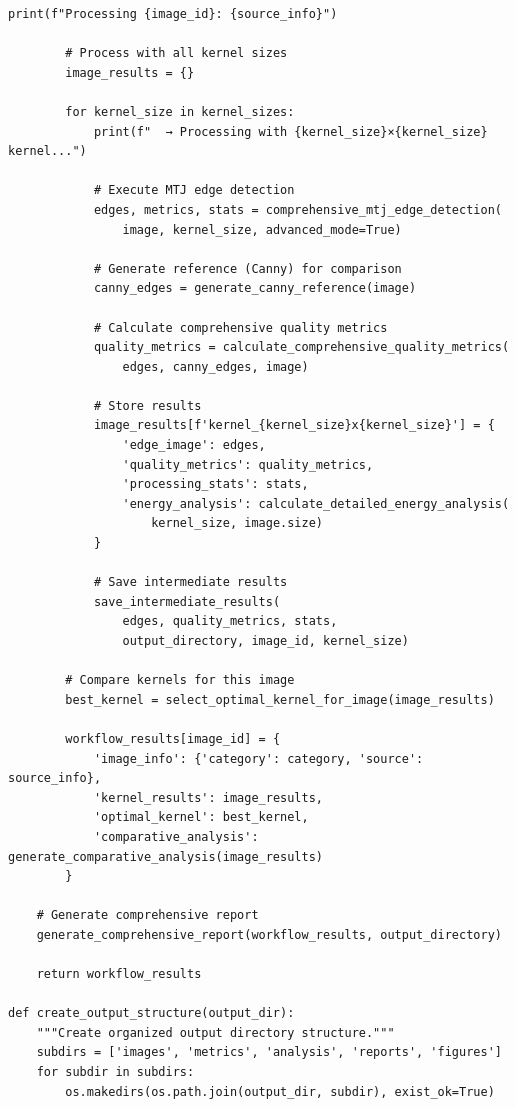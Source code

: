\documentclass[conference]{IEEEtran}
\begin{document}
{{\begin{lstlisting}[caption={Complete workflow management system}]
        print(f"Processing {image_id}: {source_info}")
        
        # Process with all kernel sizes
        image_results = {}
        
        for kernel_size in kernel_sizes:
            print(f"  → Processing with {kernel_size}×{kernel_size} kernel...")
            
            # Execute MTJ edge detection
            edges, metrics, stats = comprehensive_mtj_edge_detection(
                image, kernel_size, advanced_mode=True)
            
            # Generate reference (Canny) for comparison
            canny_edges = generate_canny_reference(image)
            
            # Calculate comprehensive quality metrics
            quality_metrics = calculate_comprehensive_quality_metrics(
                edges, canny_edges, image)
            
            # Store results
            image_results[f'kernel_{kernel_size}x{kernel_size}'] = {
                'edge_image': edges,
                'quality_metrics': quality_metrics,
                'processing_stats': stats,
                'energy_analysis': calculate_detailed_energy_analysis(
                    kernel_size, image.size)
            }
            
            # Save intermediate results
            save_intermediate_results(
                edges, quality_metrics, stats, 
                output_directory, image_id, kernel_size)
        
        # Compare kernels for this image
        best_kernel = select_optimal_kernel_for_image(image_results)
        
        workflow_results[image_id] = {
            'image_info': {'category': category, 'source': source_info},
            'kernel_results': image_results,
            'optimal_kernel': best_kernel,
            'comparative_analysis': generate_comparative_analysis(image_results)
        }
    
    # Generate comprehensive report
    generate_comprehensive_report(workflow_results, output_directory)
    
    return workflow_results

def create_output_structure(output_dir):
    """Create organized output directory structure."""
    subdirs = ['images', 'metrics', 'analysis', 'reports', 'figures']
    for subdir in subdirs:
        os.makedirs(os.path.join(output_dir, subdir), exist_ok=True)


\end{lstlisting}}}
\end{document}

